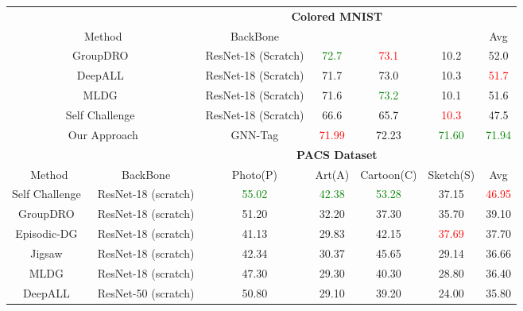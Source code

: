 \begin{table*}[ht]
\begin{center}
    \begin{tabular}{ccccccc}
  \toprule



         &          &   \multicolumn{4}{c}{\bf Colored MNIST~\cite{Arjovsky:etal:ARXIV20, Gulrajani:etal:ARXIV20}} & \\
  \multicolumn{2}{c}{Method} & BackBone &   &  &  & Avg\\
  \hline

   \multicolumn{2}{c}{GroupDRO~\cite{Sagawa:etal:ICLR20}} & ResNet-18 (Scratch)        &     \textcolor{green}{72.7}   &       \textcolor{red}{73.1} &          10.2 &          52.0 \\
   \multicolumn{2}{c}{DeepALL~\cite{Li:etal:ICCV17}}    & ResNet-18 (Scratch)       &     71.7   &       73.0 &          10.3 &           \textcolor{red}{51.7} \\

   \multicolumn{2}{c}{MLDG~\cite{Li:mini:etal:AAAI18}}    & ResNet-18 (Scratch)        &     71.6   &       \textcolor{green}{73.2} &          10.1 &          51.6 \\
   \multicolumn{2}{c}{Self Challenge~\cite{Huang:etal:ECCV20}}  & ResNet-18 (Scratch)        &     66.6   &       65.7 &          \textcolor{red}{10.3} &           47.5 \\


  \hline
  \multicolumn{2}{c}{Our Approach}   & GNN-Tag &  \textcolor{red}{71.99} & 72.23 & \textcolor{green}{71.60} & \textcolor{green}{71.94} \\ 
    
  \hline
     
         &          & \multicolumn{4}{c}{\bf PACS Dataset~\cite{Li:etal:ICCV17}} & \\
  Method & BackBone &  Photo(P) & Art(A) & Cartoon(C) & Sketch(S) & Avg\\
  \hline

  Self Challenge~\cite{Huang:etal:ECCV20}& ResNet-18 (scratch)  & \textcolor{green}{55.02} & \textcolor{green}{42.38} & \textcolor{green}{53.28} & 37.15 & \textcolor{red}{46.95} \\
  GroupDRO~\cite{Sagawa:etal:ICLR20}      & ResNet-18 (scratch)  & 51.20 & 32.20 & 37.30 & 35.70 & 39.10 \\
  Episodic-DG~\cite{Li:mini:etal:ICCV19} & ResNet-18 (scratch)  & 41.13 & 29.83 & 42.15 & \textcolor{red}{37.69} & 37.70\\
  Jigsaw~\cite{Carlucci:mini:etal:CVPR19} & ResNet-18 (scratch)  & 42.34 & 30.37 & 45.65 & 29.14 & 36.66 \\
  MLDG~\cite{Li:mini:etal:AAAI18}         & ResNet-18 (scratch)  & 47.30 & 29.30 & 40.30 & 28.80 & 36.40 \\
  DeepALL~\cite{Li:etal:ICCV17}      & ResNet-50 (scratch)  & 50.80 & 29.10 & 39.20 & 24.00 & 35.80 \\


\end{tabular}
\end{center}
\end{table*}
